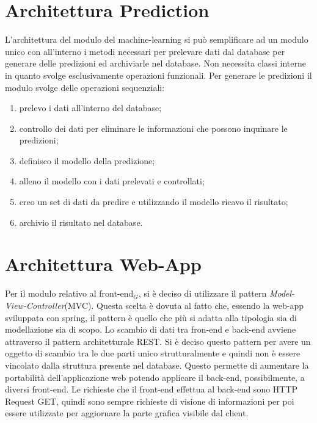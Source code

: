 \section{Architettura Prediction}\label{ArchitetturaDelProdottoPrediction}
L'architettura del modulo del machine-learning si può semplificare ad un modulo unico con all'interno i metodi necessari per prelevare dati dal database per generare delle predizioni ed archiviarle nel database.
Non necessita classi interne in quanto svolge esclusivamente operazioni funzionali. Per generare le predizioni il modulo svolge delle operazioni sequenziali:
\begin{enumerate}
	\item prelevo i dati all'interno del database;
	\item controllo dei dati per eliminare le informazioni che possono inquinare le predizioni;
	\item definisco il modello della predizione;
	\item alleno il modello con i dati prelevati e controllati;
	\item creo un set di dati da predire e utilizzando il modello ricavo il risultato;
	\item archivio il risultato nel database.
\end{enumerate}


\section{Architettura Web-App}\label{ArchitetturaDelProdottoWebApp}
Per il modulo relativo al front-end$_G$, si è deciso di utilizzare il pattern \textit{Model-View-Controller}(MVC).
Questa scelta è dovuta al fatto che, essendo la web-app sviluppata con spring, il pattern è quello che più si adatta alla tipologia sia di modellazione sia di scopo.
Lo scambio di dati tra fron-end e back-end avviene attraverso il pattern architetturale REST. Si è deciso questo pattern per avere un oggetto di scambio tra le due parti unico strutturalmente e quindi non è essere vincolato dalla struttura presente nel database.
Questo permette di aumentare la portabilità dell'applicazione web potendo applicare il back-end, possibilmente, a diversi front-end. Le richieste che il front-end effettua al back-end sono HTTP Request GET, quindi sono sempre richieste di visione di informazioni per poi essere utilizzate per aggiornare la parte grafica visibile dal client.

